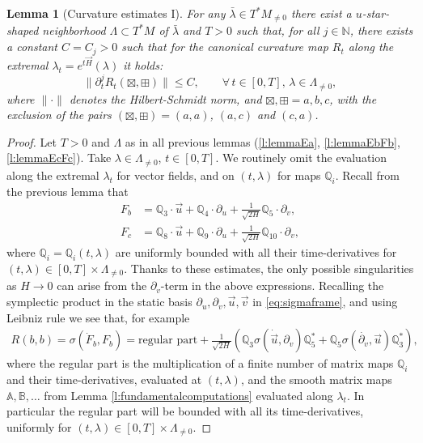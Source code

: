\documentclass[11pt,a4paper]{article}
\theoremstyle{plain}
\newtheorem{lemma}[theorem]{Lemma}
\theoremstyle{definition}
\theoremstyle{remark}
\numberwithin{equation}{section}
\newcommand{\N}{\mathbb{N}} %
\newcommand{\A}{\mathbb{A}}
\newcommand{\B}{\mathbb{B}}
\newcommand{\Q}{\mathbb{Q}}
\begin{document}
\begin{lemma}[Curvature estimates I]\label{l:lemmaRfirst}
For any $\bar{\lambda} \in T^*M_{\neq 0}$ there exist a $u$-star-shaped neighborhood $\Lambda \subset T^*M$ of $\bar{\lambda}$ and $T>0$ such that, for all $j\in \N$, there exists a constant $C=C_j>0$ such that for the canonical curvature map $R_{t}$ along the extremal $\lambda_t = e^{t\vec{H}}(\lambda)$ it holds:
\begin{equation}
\|\partial_t^j R_{t}(\boxtimes,\boxplus)\| \leq C, \qquad \forall\, t\in [0,T],\, \lambda \in \Lambda_{\neq 0},
\end{equation}
where $\|\cdot\|$ denotes the Hilbert-Schmidt norm, and $\boxtimes,\boxplus = a,b,c$, with the exclusion of the pairs $(\boxtimes,\boxplus)=(a,a)$, $(a,c)$ and $(c,a)$.
\end{lemma}
\begin{proof}
Let $T>0$ and $\Lambda$ as in all previous lemmas (\ref{l:lemmaEa}, \ref{l:lemmaEbFb}, \ref{l:lemmaEcFc}). Take $\lambda \in \Lambda_{\neq 0}$, $t\in [0,T]$. We routinely omit the evaluation along the extremal $\lambda_t$ for vector fields, and on $(t,\lambda)$ for maps $\Q_i$. Recall from the previous lemma that
\begin{align}
F_b & = \Q_3 \cdot \vec{u} + \Q_4 \cdot \partial_u + \frac{1}{\sqrt{2H}}\Q_5 \cdot \partial_v, \\
F_c & =  \Q_8 \cdot \vec{u} + \Q_9 \cdot \partial_u + \frac{1}{\sqrt{2H}}\Q_{10}\cdot \partial_v,
\end{align}
where $\Q_i=\Q_i(t,\lambda)$ are uniformly bounded with all their time-derivatives for $(t,\lambda)\in [0,T]\times \Lambda_{\neq 0}$. Thanks to these estimates, the only possible singularities as $H\to 0$ can arise from the $\partial_v$-term in the above expressions. Recalling the symplectic product in the static basis $\partial_u,\partial_v,\vec{u},\vec{v}$ in \eqref{eq:sigmaframe}, and using Leibniz rule we see that, for example
\begin{align}
R(b,b)  = \sigma(\dot{F}_b,F_b) = \text{regular part} + \frac{1}{\sqrt{2H}}\left(\Q_3 \sigma(\dot{\vec{u}},\partial_v)\Q_5^* + \Q_5 \sigma(\dot{\partial_v},\vec{u}) \Q_3^*\right),
\end{align}
where the regular part is the multiplication of a finite number of matrix maps $\Q_i$ and their time-derivatives, evaluated at $(t,\lambda)$, and the smooth matrix maps $\A,\B,\dots$ from Lemma \ref{l:fundamentalcomputations} evaluated along $\lambda_t$. In particular the regular part will be bounded with all its time-derivatives, uniformly for $(t,\lambda)\in [0,T]\times \Lambda_{\neq 0}$.


\end{proof}
\end{document}
